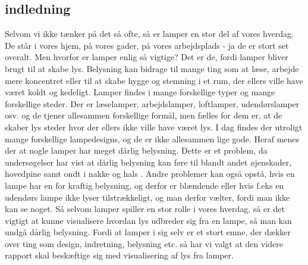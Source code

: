 \subsection{indledning}

Selvom vi ikke tænker på det så ofte, så er lamper en stor del af vores hverdag. De står i vores hjem, på vores gader, på vores arbejdsplads - ja de er stort set overalt. Men hvorfor er lamper enlig så vigtige? Det er de, fordi lamper bliver brugt til at skabe lys. Belysning kan bidrage til mange ting som at læse, arbejde mere koncentret eller til at skabe hygge og stemning i et rum, der ellers ville have været koldt og kedeligt. Lamper findes i mange forskellige typer og mange forskellige steder. Der er læselamper, arbejdslamper, loftlamper, udendørslamper osv. og de tjener allesammen forskellige formål, men fælles for dem er, at de skaber lys steder hvor der ellers ikke ville have været lys. 
I dag findes der utroligt mange forskellige lampedesigns, og de er ikke allesammen lige gode. Heraf menes der at nogle lamper har meget dårlig belysning. Dette er et problem, da undersøgelser har vist at dårlig belysning kan føre til blandt andet øjenskader, hovedpine samt ondt i nakke og hals \cite{lys_konsekvenser}. Andre problemer kan også opstå, hvis en lampe har en for kraftig belysning, og derfor er blændende eller hvis f.eks en udendørs lampe ikke lyser tilstrækkeligt, og man derfor vælter, fordi man ikke kan se noget. 
Så selvom lamper spiller en stor rolle i vores hverdag, så er det vigtigt at kunne visualisere hvordan lys udbreder sig fra en lampe, så man kan undgå dårlig belysning. 
Fordi at lamper i sig selv er et stort emne, der dækker over ting som design, indretning, belysning etc. så har vi valgt at den videre rapport skal beskæftige sig med visualisering af lys fra lamper. 


